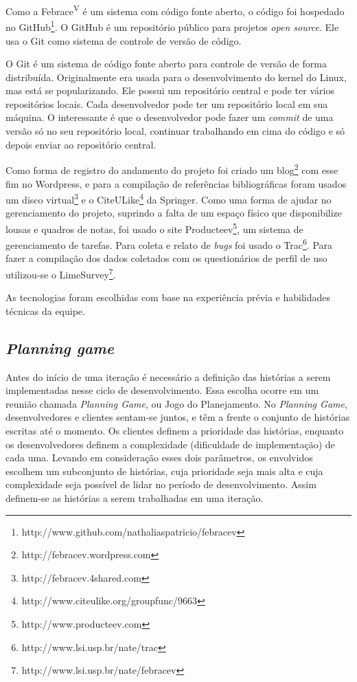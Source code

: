 Como a Febrace\textsuperscript{V} é um sistema com código fonte aberto, o código foi hospedado no GitHub\footnote{http://www.github.com/nathaliaspatricio/febracev}. O GitHub é um repositório público para projetos \textit{open source}. Ele usa o Git como sistema de controle de versão de código. 

O Git é um sistema de código fonte aberto para controle de versão de forma distribuída. Originalmente era usada para o desenvolvimento do kernel do Linux, mas está se popularizando. Ele possui um repositório central e pode ter vários repositórios locais. Cada desenvolvedor pode ter um repositório local em sua máquina. O interessante é que o desenvolvedor pode fazer um \textit{commit} de uma versão só no seu repositório local, continuar trabalhando em cima do código e só depois enviar ao repositório central.

Como forma de registro do andamento do projeto foi criado um blog\footnote{http://febracev.wordpress.com} com esse fim no Wordpress, e para a compilação de referências bibliográficas foram usados um disco virtual\footnote{http://febracev.4shared.com} e o CiteULike\footnote{http://www.citeulike.org/groupfunc/9663} da Springer. Como uma forma de ajudar no gerenciamento do projeto, suprindo a falta de um espaço físico que disponibilize lousas e quadros de notas, foi usado o site Producteev\footnote{http://www.producteev.com}, um sistema de gerenciamento de tarefas. Para coleta e relato de \textit{bugs} foi usado o Trac\footnote{http://www.lsi.usp.br/nate/trac}. Para fazer a compilação dos dados coletados com os questionários de perfil de uso utilizou-se o LimeSurvey\footnote{http://www.lsi.usp.br/nate/febracev}.

As tecnologias foram escolhidas com base na experiência prévia e habilidades técnicas da equipe.

  \subsection{\textit{Planning game}}
    Antes do início de uma iteração é necessário a definição das histórias a serem implementadas nesse ciclo de desenvolvimento. Essa escolha ocorre em um reunião chamada \textit{Planning Game}, ou Jogo do Planejamento. No \textit{Planning Game}, desenvolvedores e clientes sentam-se juntos, e têm a frente o conjunto de histórias escritas até o momento. Os clientes definem a prioridade das histórias, enquanto os desenvolvedores definem a complexidade (dificuldade de implementação) de cada uma. Levando em consideração esses dois parâmetros, os envolvidos escolhem um subconjunto de histórias, cuja prioridade seja mais alta e cuja complexidade seja possível de lidar no período de desenvolvimento. Assim definem-se as histórias a serem trabalhadas em uma iteração.

